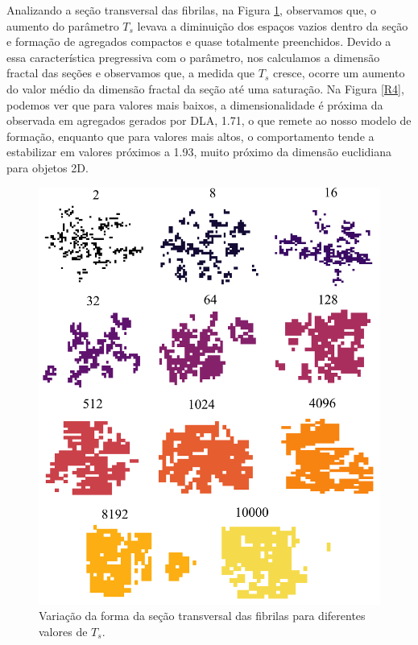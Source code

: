 \documentclass{article}
\begin{document}
Analizando a seção transversal das fibrilas, na Figura \ref{R3}, observamos que, o aumento do parâmetro $T_{s}$ levava a diminuição dos espaços vazios dentro da seção e formação de agregados compactos e quase totalmente preenchidos. Devido a essa característica pregressiva com o parâmetro, nos calculamos a dimensão fractal das seções e observamos que, a medida que $T_{s}$ cresce, ocorre um aumento do valor médio da dimensão fractal da seção até uma saturação. Na Figura \ref{R4}, podemos ver que para valores mais baixos, a dimensionalidade é próxima da observada em agregados gerados por DLA, 1.71, o que remete ao nosso modelo de formação, enquanto que para valores mais altos, o comportamento tende a estabilizar em valores próximos a 1.93, muito próximo da dimensão euclidiana para objetos 2D.

\begin{figure}[H]
    \centering
    \includegraphics[width=\textwidth]{figures/cs_all.png}
    \caption{Variação da forma da seção transversal das fibrilas para diferentes valores de $T_{s}$.} 
    \label{R3}
\end{figure}
\end{document}
